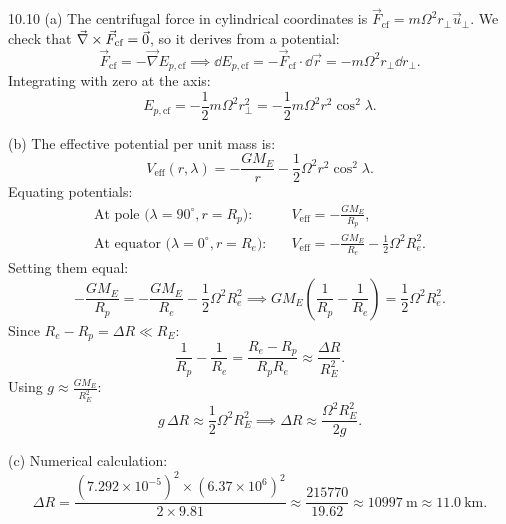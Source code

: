 \begin{tabletworkspace}[6.0cm]
\end{tabletworkspace}

\begin{solution}{10.10}
(a) The centrifugal force in cylindrical coordinates is $\vec{F}_{\text{cf}} = m\Omega^2 r_\perp\vec{u}_\perp$.
We check that $\vec{\nabla}\times\vec{F}_{\text{cf}} = \vec{0}$, so it derives from a potential:
\[
\vec{F}_{\text{cf}} = -\vec{\nabla} E_{p, \text{cf}} \implies \dd E_{p, \text{cf}} = -\vec{F}_{\text{cf}}\cdot\dd\vec{r} = -m\Omega^2 r_\perp\dd r_\perp.
\]
Integrating with zero at the axis:
\[
E_{p, \text{cf}} = -\frac{1}{2}m\Omega^2 r_\perp^2 = -\frac{1}{2}m\Omega^2 r^2\cos^2\lambda.
\]

(b) The effective potential per unit mass is:
\[
V_{\text{eff}}(r, \lambda) = -\frac{GM_E}{r} - \frac{1}{2}\Omega^2 r^2\cos^2\lambda.
\]
Equating potentials:
\begin{align*}
\text{At pole ($\lambda = 90^\circ, r=R_p$):}\quad & V_{\text{eff}} = -\frac{GM_E}{R_p}, \\
\text{At equator ($\lambda = 0^\circ, r=R_e$):}\quad & V_{\text{eff}} = -\frac{GM_E}{R_e} - \frac{1}{2}\Omega^2 R_e^2.
\end{align*}
Setting them equal:
\[
-\frac{GM_E}{R_p} = -\frac{GM_E}{R_e} - \frac{1}{2}\Omega^2 R_e^2 \implies GM_E\left(\frac{1}{R_p} - \frac{1}{R_e}\right) = \frac{1}{2}\Omega^2 R_e^2.
\]
Since $R_e - R_p = \Delta R \ll R_E$:
\[
\frac{1}{R_p} - \frac{1}{R_e} = \frac{R_e - R_p}{R_p R_e} \approx \frac{\Delta R}{R_E^2}.
\]
Using $g \approx \frac{GM_E}{R_E^2}$:
\[
g\,\Delta R \approx \frac{1}{2}\Omega^2 R_E^2 \implies \boxed{\Delta R \approx \frac{\Omega^2 R_E^2}{2g}.}
\]

(c) Numerical calculation:
\[
\Delta R = \frac{(7.292\times 10^{-5})^2\times(6.37\times 10^6)^2}{2\times 9.81} \approx \frac{215770}{19.62} \approx 10997\ \mathrm{m} \approx \mathbf{11.0\ \mathrm{km}}.
\]
\end{solution}
